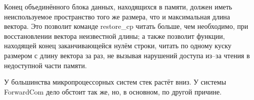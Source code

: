 \documentclass[forwardcom.tex]{subfiles}
\begin{document}
Конец объединённого блока данных, находящихся в памяти, должен иметь неиспользуемое пространство того же размера, что и максимальная длина вектора. Это позволит команде restore\_cp читать больше, чем необходимо, при восстановлении вектора неизвестной длины;  а также позволит функции, находящей конец заканчивающейся нулём строки, читать по одному куску размером с длину вектора за раз, не вызывая нарушений доступа из--за чтения в недоступной части памяти.

У большинства микропроцессорных систем стек растёт вниз. У системы ForwardCom дело обстоит так же, но, в основном, по другой причине.
%
%
%
\end{document}
